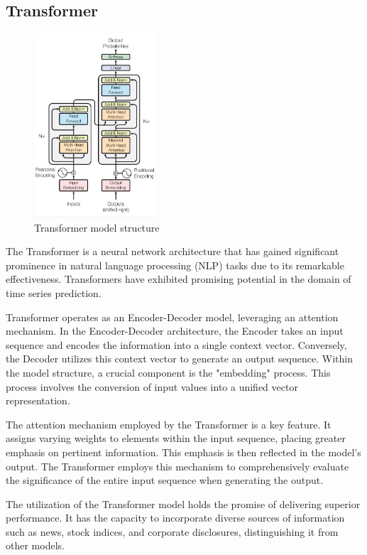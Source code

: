 \subsection{Transformer}

\begin{figure}
	\includegraphics[width=0.4\textwidth]{Fig/Transformer.jpg}
	\caption{Transformer model structure}
\end{figure}
The Transformer is a neural network architecture that has gained significant prominence in natural language processing (NLP) tasks 
due to its remarkable effectiveness. Transformers have exhibited promising potential in the domain of time series prediction.

Transformer operates as an Encoder-Decoder model, leveraging an attention mechanism.
In the Encoder-Decoder architecture, the Encoder takes an input sequence and encodes the information into a single context vector. 
Conversely, the Decoder utilizes this context vector to generate an output sequence.
Within the model structure, a crucial component is the "embedding" process. 
This process involves the conversion of input values into a unified vector representation.

The attention mechanism employed by the Transformer is a key feature. 
It assigns varying weights to elements within the input sequence, placing greater emphasis on pertinent information. 
This emphasis is then reflected in the model's output. 
The Transformer employs this mechanism to comprehensively evaluate the significance of the entire input sequence when generating the output.

The utilization of the Transformer model holds the promise of delivering superior performance. 
It has the capacity to incorporate diverse sources of information such as news, stock indices, and corporate disclosures, distinguishing it from other models.
